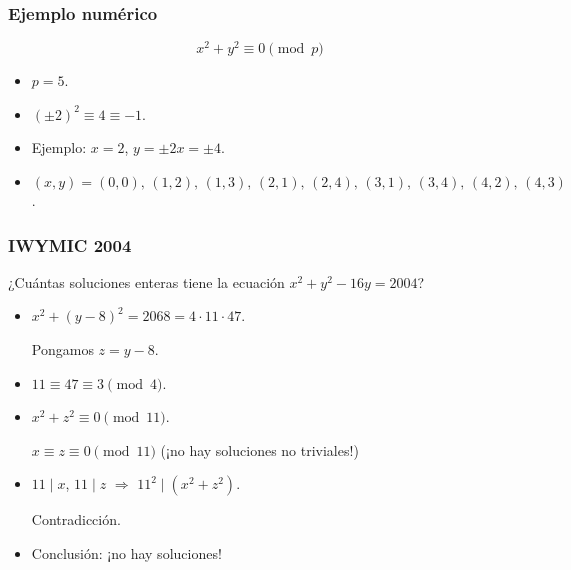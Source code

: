 \documentclass[handout]{beamer}
\begin{document}

\begin{frame}[fragile]
  \frametitle{Ejemplo numérico}

  \[ x^2 + y^2 \equiv 0 \pmod{p} \]

  \begin{itemize}
  \item<2-> $p = 5$.

  \item<3-> $(\pm 2)^2 \equiv 4 \equiv -1$.

  \item<4-> Ejemplo: $x = 2$, $y = \pm 2 x = \pm 4$.

  \item<5-> $(x,y) = (0,0), \, (1,2), \, (1,3), \, (2,1), \, (2,4), \, (3, 1), \, (3, 4), \, (4, 2), \, (4, 3)$.
  \end{itemize}
\end{frame}


\begin{frame}[fragile]
  \frametitle{IWYMIC 2004}

  \begin{shaded}
    ¿Cuántas soluciones enteras tiene la ecuación $x^2 + y^2 - 16y = 2004$?
  \end{shaded}

  \vspace{\fill}

  \ifdefined\solutions

  \begin{itemize}
  \item<3-> $x^2 + (y - 8)^2 = 2068 = 4\cdot 11\cdot 47$.

    Pongamos $z = y-8$.

  \item<4-> $11 \equiv 47 \equiv 3 \pmod{4}$.

  \item<5-> $x^2 + z^2 \equiv 0 \pmod{11}$.

    $x \equiv z \equiv 0 \pmod{11}$ (¡no hay soluciones no triviales!)

  \item<6-> $11 \mid x$, $11 \mid z$ $\Longrightarrow$ $11^2 \mid (x^2 + z^2)$.

    Contradicción.

  \item<7-> Conclusión: ¡no hay soluciones!
  \end{itemize}
  \fi
\end{frame}
\end{document}
